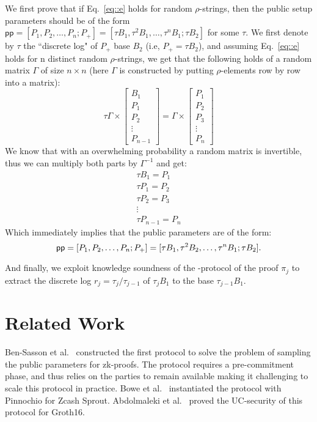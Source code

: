 \documentclass{article}
\newcommand{\pp}{\mathsf{pp}}
\begin{document}
We first prove that if Eq.~\ref{eq::e} holds for random $\rho$-strings, then the public setup parameters should be of the form $\pp = [P_1, P_2, \ldots, P_n; P_+] = [\tau B_1, \tau^2 B_1, \ldots, \tau^n B_1; \tau B_2]$ for some $\tau$. We first denote by $\tau$ the ``discrete log" of $P_+$ base $B_2$ (i.e, $P_+ = \tau B_2$), and assuming Eq.~\ref{eq::e} holds for n distinct random $\rho$-strings, we get that the following holds of a random matrix $\Gamma$ of size $n \times n$ (here $\Gamma$ is constructed by putting $\rho$-elements row by row into a matrix):
\[\tau \Gamma \times \begin{bmatrix}
           B_1 \\
           P_1 \\
           P_2 \\
           \vdots \\
           P_{n-1}
         \end{bmatrix} = \Gamma \times\begin{bmatrix}
           P_1 \\
           P_2 \\
           P_3 \\
           \vdots \\
           P_n
         \end{bmatrix}
\]
We know that with an overwhelming probability a random matrix is invertible, thus we can multiply both parts by $\Gamma^{-1}$ and get:
\[\begin{matrix}
           \tau B_1 = P_1 \\
           \tau P_1 = P_2 \\
           \tau P_2 = P_3 \\
           \vdots \\
           \tau P_{n-1} = P_n
         \end{matrix}
\]
Which immediately implies that the public parameters are of the form:
\[\pp = [P_1, P_2, \ldots, P_n; P_+] = \linebreak[0] [\tau B_1, \tau^2 B_2, \ldots, \tau^n B_1; \tau B_2].\]

And finally, we exploit knowledge soundness of the \textSigma{}-protocol of the proof $\pi_j$ to extract the discrete log $r_j = \tau_j/\tau_{j-1}$ of $\tau_j B_1$ to the base $\tau_{j-1} B_1$.

\section{Related Work}
Ben-Sasson et al.~\cite{ben2015secure} constructed the first protocol to solve the problem of sampling the public parameters for zk-proofs. The protocol requires a pre-commitment phase, and thus relies on the parties to remain available making it challenging to scale this protocol in practice. Bowe et al.~\cite{bowe2018multi} instantiated the protocol with Pinnochio for Zcash Sprout. Abdolmaleki et al.~\cite{abdolmaleki2019uc} proved the UC-security of this protocol for Groth16.
\end{document}
